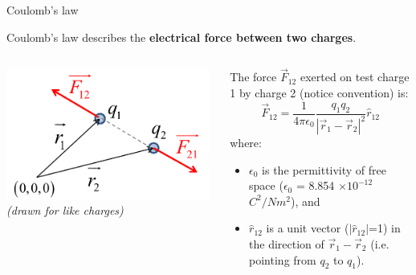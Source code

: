 \begin{frame}{Coulomb's law}

Coulomb's law describes the {\bf electrical force between two charges}.\\

\vspace{0.4cm}

\begin{columns}
  \begin{column}{0.45\textwidth}
   \begin{center}
     \includegraphics[width=0.98\textwidth]{./images/schematics/coulomb_force_2_like_charges.png}\\
     \vspace{0.3cm}
     {\it \small (drawn for like charges)}
   \end{center}
  \end{column}
  \begin{column}{0.55\textwidth}
     The force $\vec{F}_{12}$ exerted on test charge 1 by charge 2 (notice convention) is:\\
     {\Large
     \begin{equation*}
       \vec{F}_{12} = \frac{1}{4\pi\epsilon_0} \frac{q_1 q_2}{|\vec{r}_{1}-\vec{r}_{2}|^{2}} \hat{r}_{12}
     \end{equation*}
     }
     where:
        \begin{itemize}
          \item $\epsilon_0$ is the permittivity of free space ($\epsilon_0$ = 8.854 $\times 10^{-12}$ $C^2/Nm^2$), and
          \item $\hat{r}_{12}$ is a unit vector ($|\hat{r}_{12}|$=1) in the direction of $\vec{r}_{1}-\vec{r}_{2}$ (i.e. pointing from $q_2$ to $q_1$).
        \end{itemize}
  \end{column}
\end{columns}

\end{frame}


